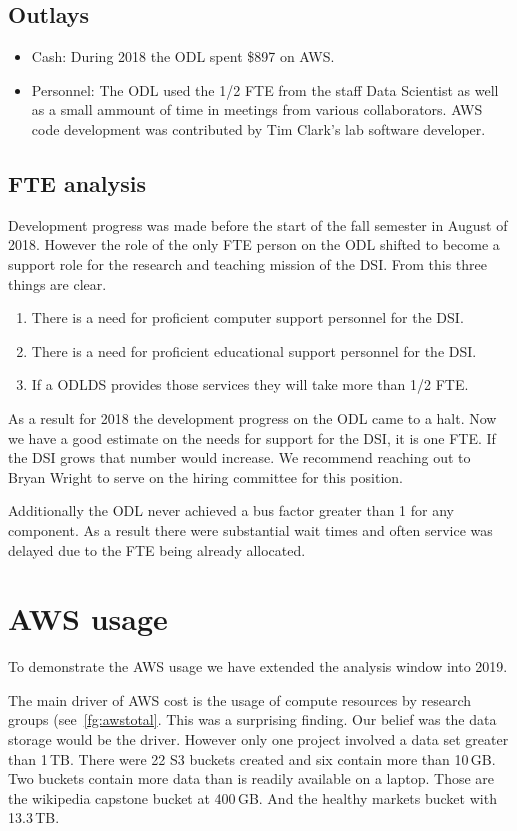 \subsection{Outlays}
\begin{itemize}
\item Cash: During 2018 the ODL spent \$897 on AWS.
\item Personnel: The ODL used the 1/2 FTE from the staff Data Scientist as well as a small ammount of time in meetings from various collaborators. AWS code development was contributed by Tim Clark's lab software developer.
\end{itemize}


\subsection{FTE analysis}
Development progress was made before the start of the fall semester in August of 2018. However the role of the only FTE person on the ODL shifted to become a support role for the research and teaching mission of the DSI. From this three things are clear. 
\begin{enumerate}
\item There is a need for proficient computer support personnel for the DSI.
\item There is a need for proficient educational support personnel for the DSI.
\item If a ODLDS provides those services they will take more than 1/2 FTE.
\end{enumerate}
As a result for 2018 the development progress on the ODL came to a halt. Now we have a good estimate on the needs for support for the DSI, it is one FTE. If the DSI grows that number would increase. We recommend reaching out to Bryan Wright to serve on the hiring committee for this position.

Additionally the ODL never achieved a bus factor greater than 1 for any component. As a result there were substantial wait times and often service was delayed due to the FTE being already allocated.

\section{AWS usage}
To demonstrate the AWS usage we have extended the analysis window into 2019. 

The main driver of AWS cost is the usage of compute resources by research groups (see~\ref{fg:awstotal}. This was a surprising finding. Our belief was the data storage would be the driver. However only one project involved a data set greater than 1\,TB.
There were 22 S3 buckets created and six contain more than 10\,GB. Two buckets contain more data than is readily available on a laptop. Those are the wikipedia capstone bucket at 400\,GB. And the healthy markets bucket with 13.3\,TB.

